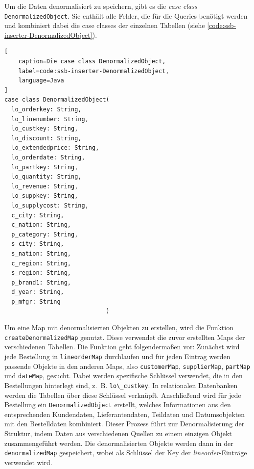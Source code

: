 Um die Daten denormalisiert zu speichern, gibt es die \emph{case class} \lstinline|DenormalizedObject|. Sie enthält alle Felder, die für die Queries benötigt werden und kombiniert dabei die case classes der einzelnen Tabellen (siehe \cref{code:ssb-inserter-DenormalizedObject}).

\begin{lstlisting}[
    caption=Die case class DenormalizedObject,
    label=code:ssb-inserter-DenormalizedObject,
    language=Java
]
case class DenormalizedObject(
  lo_orderkey: String,
  lo_linenumber: String,
  lo_custkey: String,
  lo_discount: String,
  lo_extendedprice: String,
  lo_orderdate: String,
  lo_partkey: String,
  lo_quantity: String,
  lo_revenue: String,
  lo_suppkey: String,
  lo_supplycost: String,
  c_city: String,
  c_nation: String,
  p_category: String,
  s_city: String,
  s_nation: String,
  c_region: String,
  s_region: String,
  p_brand1: String,
  d_year: String,
  p_mfgr: String
							 )
\end{lstlisting}



Um eine Map mit denormalisierten Objekten zu erstellen, wird die Funktion \lstinline|createDenormalizedMap| genutzt. Diese verwendet die zuvor erstellten Maps der verschiedenen Tabellen. Die Funktion geht folgendermaßen vor: Zunächst wird jede Bestellung in \lstinline|lineorderMap| durchlaufen und für jeden Eintrag werden passende Objekte in den anderen Maps, also  \lstinline|customerMap|, \lstinline|supplierMap|, \lstinline|partMap| und \lstinline|dateMap|, gesucht. Dabei werden spezifische Schlüssel verwendet, die in den Bestellungen hinterlegt sind, z.~B. \lstinline|lo\_custkey|. In relationalen Datenbanken werden die Tabellen über diese Schlüssel verknüpft. Anschließend wird für jede Bestellung ein \lstinline|DenormalizedObject| erstellt, welches Informationen aus den entsprechenden Kundendaten, Lieferantendaten, Teildaten und Datumsobjekten mit den Bestelldaten kombiniert. Dieser Prozess führt zur Denormalisierung der Struktur, indem Daten aus verschiedenen Quellen zu einem einzigen Objekt zusammengeführt werden. Die denormalisierten Objekte werden dann in der \lstinline|denormalizedMap| gespeichert, wobei als Schlüssel der Key der \emph{lineorder}-Einträge verwendet wird.

